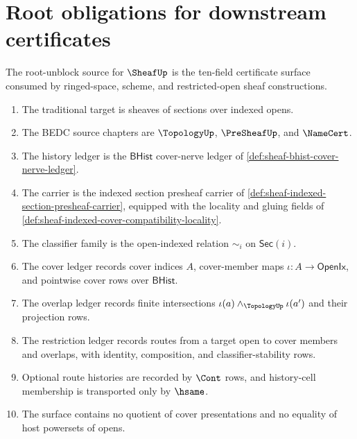 \section{Root obligations for downstream certificates}
\label{sec:sheaf-root-obligations}

\begin{definition}
\label{def:sheaf-root-unblock-bedc-source}
The root-unblock source for $\SheafUp$ is the ten-field certificate surface consumed by ringed-space, scheme, and restricted-open sheaf constructions.
\begin{enumerate}
\item The traditional target is sheaves of sections over indexed opens.
\item The BEDC source chapters are $\TopologyUp$, $\PreSheafUp$, and $\NameCert$.
\item The history ledger is the $\mathsf{BHist}$ cover-nerve ledger of \autoref{def:sheaf-bhist-cover-nerve-ledger}.
\item The carrier is the indexed section presheaf carrier of \autoref{def:sheaf-indexed-section-presheaf-carrier}, equipped with the locality and gluing fields of \autoref{def:sheaf-indexed-cover-compatibility-locality}.
\item The classifier family is the open-indexed relation $\sim_i$ on $\mathsf{Sec}(i)$.
\item The cover ledger records cover indices $A$, cover-member maps $\iota:A\to\mathsf{OpenIx}$, and pointwise cover rows over $\mathsf{BHist}$.
\item The overlap ledger records finite intersections $\iota(a)\wedge_{\TopologyUp}\iota(a')$ and their projection rows.
\item The restriction ledger records routes from a target open to cover members and overlaps, with identity, composition, and classifier-stability rows.
\item Optional route histories are recorded by $\Cont$ rows, and history-cell membership is transported only by $\hsame$.
\item The surface contains no quotient of cover presentations and no equality of host powersets of opens.
\end{enumerate}
\end{definition}

